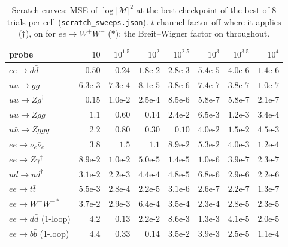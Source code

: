 \documentclass[11pt]{article}
\newcommand{\code}[1]{\texttt{#1}}
\begin{document}
\begin{table}[H]
\centering
\caption{Scratch curves: MSE of $\log|\mathcal M|^2$ at the best checkpoint of the best of $8$
trials per cell (\code{scratch\_sweeps.json}). $t$-channel factor off where it applies ($\dagger$),
on for $ee\to W^+W^-$ ($\ast$); the Breit--Wigner factor on throughout.}
\label{tab:ladder_scratch}
\small
\begin{tabular}{@{}lrrrrrrr@{}}
\toprule
probe & $10$ & $10^{1.5}$ & $10^2$ & $10^{2.5}$ & $10^3$ & $10^{3.5}$ & $10^4$ \\
\midrule
$ee\to d\bar d$ & $0.50$ & $0.24$ & $1.8\text{e-}2$ & $2.8\text{e-}3$ & $5.4\text{e-}5$ & $4.0\text{e-}6$ & $1.4\text{e-}6$ \\
$u\bar u\to gg^\dagger$ & $6.3\text{e-}3$ & $7.3\text{e-}4$ & $8.1\text{e-}5$ & $3.8\text{e-}6$ & $7.4\text{e-}7$ & $3.8\text{e-}7$ & $1.0\text{e-}7$ \\
$u\bar u\to Zg^\dagger$ & $0.15$ & $1.0\text{e-}2$ & $2.5\text{e-}4$ & $8.5\text{e-}6$ & $5.8\text{e-}7$ & $5.8\text{e-}7$ & $2.1\text{e-}7$ \\
$u\bar u\to Zgg$ & $1.1$ & $0.60$ & $0.14$ & $2.4\text{e-}2$ & $6.5\text{e-}3$ & $1.2\text{e-}3$ & $3.4\text{e-}4$ \\
$u\bar u\to Zggg$ & $2.2$ & $0.80$ & $0.30$ & $0.10$ & $4.0\text{e-}2$ & $1.5\text{e-}2$ & $4.5\text{e-}3$ \\
$ee\to\nu_e\bar\nu_e$ & $3.8$ & $1.5$ & $1.1$ & $8.9\text{e-}2$ & $5.3\text{e-}2$ & $4.0\text{e-}3$ & $1.2\text{e-}4$ \\
$ee\to Z\gamma^\dagger$ & $8.9\text{e-}2$ & $1.0\text{e-}2$ & $5.0\text{e-}5$ & $1.4\text{e-}5$ & $1.0\text{e-}6$ & $3.9\text{e-}7$ & $2.3\text{e-}7$ \\
$ud\to ud^\dagger$ & $3.1\text{e-}2$ & $2.2\text{e-}3$ & $4.4\text{e-}4$ & $4.8\text{e-}5$ & $6.8\text{e-}6$ & $2.9\text{e-}6$ & $2.2\text{e-}6$ \\
$ee\to t\bar t$ & $5.5\text{e-}3$ & $2.8\text{e-}4$ & $2.2\text{e-}5$ & $3.1\text{e-}6$ & $2.6\text{e-}7$ & $2.2\text{e-}7$ & $1.3\text{e-}7$ \\
$ee\to W^+W^{-\ast}$ & $3.7\text{e-}2$ & $2.9\text{e-}3$ & $6.4\text{e-}4$ & $3.5\text{e-}4$ & $2.3\text{e-}4$ & $2.8\text{e-}5$ & $2.3\text{e-}5$ \\
$ee\to d\bar d$ (1-loop) & $4.2$ & $0.13$ & $2.2\text{e-}2$ & $8.6\text{e-}3$ & $1.3\text{e-}3$ & $4.1\text{e-}5$ & $2.0\text{e-}5$ \\
$ee\to b\bar b$ (1-loop) & $4.4$ & $0.33$ & $0.14$ & $3.5\text{e-}2$ & $3.9\text{e-}3$ & $2.5\text{e-}5$ & $1.1\text{e-}4$ \\
\bottomrule
\end{tabular}
\end{table}
\end{document}
